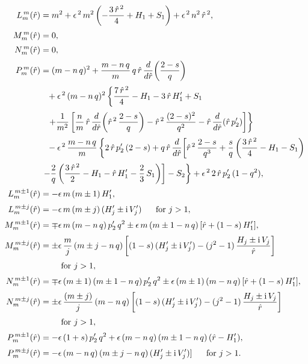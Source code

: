 \documentclass[12pt,prb,aps]{revtex4-1}
\begin{document}
\begin{align}
L_m^{\,m}(\hat{r})&= m^2 + \epsilon^{\,2}\,m^2\left(-\frac{3\,\hat{r}^{\,2}}{4} + H_1+S_1\right)+ \epsilon^{\,2}\,n^2\,\hat{r}^{\,2},\\[0.5ex]
M_m^{\,m}(\hat{r})&= 0,\\[0.5ex]
N_m^{\,m}(\hat{r})&= 0,\\[0.5ex]
P_m^{\,m}(\hat{r}) &= (m-n\,q)^2+ \frac{m-n\,q}{m}\,q\,\hat{r}\,\frac{d}{d\hat{r}}\!\left(\frac{2-s}{q}\right)\nonumber\\[0.5ex]
&\phantom{=}+\epsilon^{\,2}\,(m-n\,q)^2\left\{\frac{7\,\hat{r}^{\,2}}{4} -H_1-3\,\hat{r}\,H_1'+S_1\right.\nonumber\\[0.5ex]
&\phantom{=} \left.+\frac{1}{m^2}\left[\frac{n}{m}\,\hat{r}\,\frac{d}{d\hat{r}}\!\left(\hat{r}^{\,2}\,\frac{2-s}{q}\right)
-\hat{r}^{\,2}\,\frac{(2-s)^2}{q^2}-\hat{r}\,\frac{d}{d\hat{r}}(\hat{r}\,p_2')\right]\right\}\nonumber\\[0.5ex]
&\phantom{=}-\epsilon^{\,2}\,\frac{m-n\,q}{m}\left\{2\,\hat{r}\,p_2'\,(2-s) +q\,\hat{r}\,\frac{d}{d\hat{r}}\!\left[
\hat{r}^{\,2}\,\frac{2-s}{q^3}+\frac{s}{q}\left(\frac{3\,\hat{r}^{\,2}}{4}-H_1-S_1\right)\right.\right.\nonumber\\[0.5ex]
&\left.\left.-\frac{2}{q}\left(\frac{3\,\hat{r}^{\,2}}{2}-H_1-\hat{r}\,H_1'-\frac{2}{3}\,S_1\right)\right]-S_2\right\}+\epsilon^{\,2}\,2\,\hat{r}\,p_2'\,(1-q^2),\\[0.5ex]
L_m^{\,m\pm 1}(\hat{r}) &= -\epsilon\,m\,(m\pm 1)\,H_1',\\[0.5ex]
L_m^{\,m\pm j}(\hat{r})&= - \epsilon\,m\,(m\pm j)\,(H_j'\pm {\rm i}\,V_j')\mbox{~~~~~for $j>1$},\\[0.5ex]
M_m^{\,m\pm 1}(\hat{r}) &= \mp \epsilon\,m\,(m-n\,q)\,p_2'\,q^2\pm \epsilon\,m\,(m\pm 1-n\,q)\,[\hat{r}+ (1-s)\,H_1'],\\[0.5ex]
M_m^{\,m\pm j}(\hat{r}) &= \pm \epsilon\,\frac{m}{j}\,(m\pm j-n\,q)\left[(1-s)\,(H_j'\pm {\rm i}\,V_j')-(j^2-1)\,\frac{H_j\pm{\rm i} \,V_j}{\hat{r}}\right]\nonumber\\[0.5ex]&\phantom{=}\mbox{~~~~~for $j>1$},\\[0.5ex]
N_m^{\,m\pm 1}(\hat{r}) &= \mp \epsilon\,(m\pm 1)\,(m\pm 1-n\,q)\,p_2'\,q^2\pm \epsilon\,(m\pm 1)\,(m-n\,q)\,[\hat{r}+ (1-s)\,H_1'],\\[0.5ex]
N_m^{\,m\pm j}(\hat{r}) &= \pm \epsilon\,\frac{(m\pm j)}{j}\,(m-n\,q)\left[(1-s)\,(H_j'\pm {\rm i}\,V_j')-(j^2-1)\,\frac{H_j\pm{\rm i}\, V_j}{\hat{r}}\right]\nonumber\\[0.5ex]&\phantom{=}\mbox{~~~~~for $j>1$},\\[0.5ex]
P_m^{\,m\pm 1}(\hat{r})&= -\epsilon\,(1+s)\,p_2'\,q^2+ \epsilon\,(m-n\,q)\,(m\pm 1-n\,q)\,(\hat{r}-H_1'),\\[0.5ex]
P_m^{\,m\pm j}(\hat{r})&= -\epsilon\,(m-n\,q)\,(m\pm j-n\,q)\,(H_j' \pm {\rm i} \,V_j')]\mbox{~~~~~for $j>1$}.
\end{align}
\end{document}
